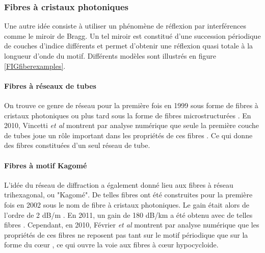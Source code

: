 \subsubsection{Fibres à cristaux photoniques}

Une autre idée consiste à utiliser un phénomène de réflexion par interférences comme le miroir de Bragg. Un tel miroir est constitué d'une succession périodique de couches d'indice différents et permet d'obtenir une réflexion quasi totale à la longueur d'onde du motif. Différents modèles sont illustrés en figure \ref{FIGfiberexamples}.

\paragraph{Fibres à réseaux de tubes}
On trouve ce genre de réseau pour la première fois en 1999 sous forme de fibres à cristaux photoniques \cite{cregan_single-mode_1999} ou plus tard sous la forme de fibres microstructurées \cite{argyros_hollow-core_2006}. En 2010, Vincetti \emph{et al} montrent par analyse numérique que seule la première couche de tubes joue un rôle important dans les propriétés de ces fibres \cite{vincetti_waveguiding_2010}. Ce qui donne des fibres constituées d'un seul réseau de tube.

\paragraph{Fibres à motif Kagomé}
L'idée du réseau de diffraction a également donné lieu aux fibres à réseau trihexagonal, ou "Kagomé". De telles fibres ont été construites pour la première fois en 2002 sous le nom de fibre à cristaux photoniques. Le gain était alors de l'ordre de 2 dB/m \cite{benabid_stimulated_2002}. En 2011, un gain de 180 dB/km a été obtenu avec de telles fibres \cite{wang_low_2011}.
Cependant, en 2010, Février \emph{et al} montrent par analyse numérique que les propriétés de ces fibres ne reposent pas tant sur le motif périodique que sur la forme du cœur \cite{fevrier_understanding_2010}, ce qui ouvre la voie aux fibres à cœur hypocycloide. 


